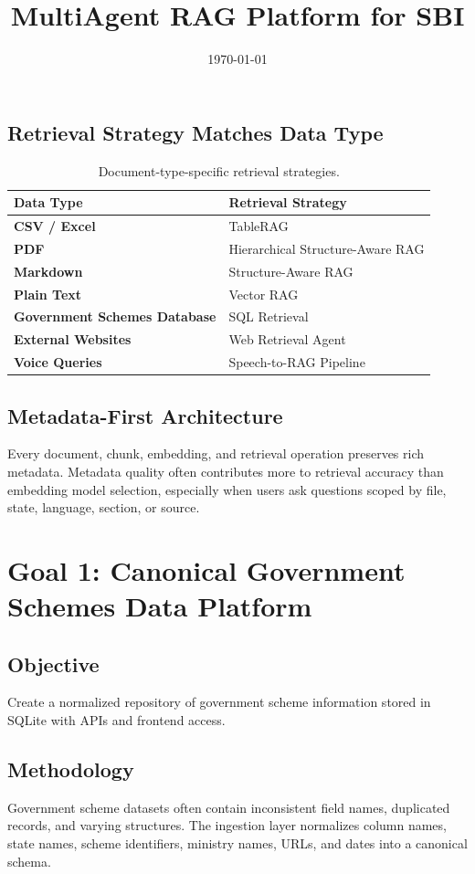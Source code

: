 \documentclass[11pt]{article}
\title{\bfseries\color{prismblue}MultiAgent RAG Platform for SBI\\[-0.2em]}
\date{\today}
\begin{document}
\maketitle


\subsection{Retrieval Strategy Matches Data Type}
\begin{table}[h]
\centering
\begin{tabularx}{\textwidth}{>{\bfseries}lY}
\toprule
Data Type & Retrieval Strategy \\
\midrule
CSV / Excel & TableRAG \\
PDF & Hierarchical Structure-Aware RAG \\
Markdown & Structure-Aware RAG \\
Plain Text & Vector RAG \\
Government Schemes Database & SQL Retrieval \\
External Websites & Web Retrieval Agent \\
Voice Queries & Speech-to-RAG Pipeline \\
\bottomrule
\end{tabularx}
\caption{Document-type-specific retrieval strategies.}
\end{table}

\subsection{Metadata-First Architecture}
Every document, chunk, embedding, and retrieval operation preserves rich metadata.
Metadata quality often contributes more to retrieval accuracy than embedding model
selection, especially when users ask questions scoped by file, state, language,
section, or source.

\section{Goal 1: Canonical Government Schemes Data Platform}

\subsection{Objective}
Create a normalized repository of government scheme information stored in SQLite with
APIs and frontend access.

\subsection{Methodology}
Government scheme datasets often contain inconsistent field names, duplicated records,
and varying structures. The ingestion layer normalizes column names, state names,
scheme identifiers, ministry names, URLs, and dates into a canonical schema.
\end{document}
